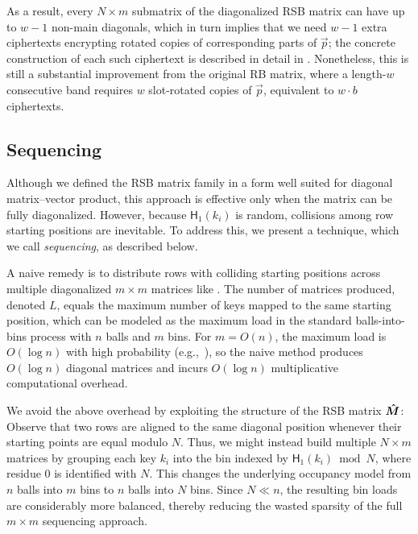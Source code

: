 As a result, every $N \times m$ submatrix of the diagonalized RSB matrix can have up to $w-1$ non-main diagonals, which in turn implies that we need $w-1$ extra ciphertexts encrypting rotated copies of corresponding parts of $\vec p$; the concrete construction of each such ciphertext is described in detail in . Nonetheless, this is still a substantial improvement from the original RB matrix, where a length-$w$ consecutive band requires $w$ slot-rotated copies of $\vec p$, equivalent to $w\cdot b$ ciphertexts.

\subsection{Sequencing} \label{subsec:sequencing} 
Although we defined the RSB matrix family in a form well suited for diagonal matrix--vector product, this approach is effective only when the matrix can be fully diagonalized. However, because $\mathsf{H}_1(k_i)$ is random, collisions among row starting positions are inevitable. To address this, we present a technique, which we call \emph{sequencing}, as described below.

A naive remedy is to distribute rows with colliding starting positions across multiple diagonalized $m\times m$ matrices like . 
The number of matrices produced, denoted $L$, equals the maximum number of keys mapped to the same starting position, which can be modeled as the maximum load in the standard balls-into-bins process with $n$ balls and $m$ bins. 
For $m = O(n)$, the maximum load is $O(\log n)$ with high probability (e.g.,~\cite{RS98}), so the naive method produces $O(\log n)$ diagonal matrices and incurs $O(\log n)$ multiplicative computational overhead.

We avoid the above overhead by exploiting the structure of the RSB matrix $\bm{\hat{M}}$:
Observe that two rows are aligned to the same diagonal position whenever their starting points are equal modulo $N$.
Thus, we might instead build multiple $N \times m$ matrices by grouping each key $k_i$ into the bin indexed by $\mathsf{H}_1(k_i) \bmod N$, where residue $0$ is identified with $N$. 
This changes the underlying occupancy model from $n$ balls into $m$ bins to $n$ balls into $N$ bins. Since $N\ll n$, the resulting bin loads are considerably more balanced, thereby reducing the wasted sparsity of the full $m\times m$ sequencing approach.


